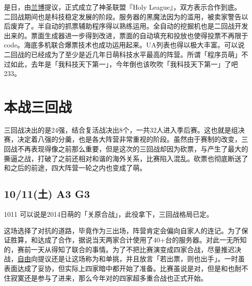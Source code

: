 是日，由\uline{兰博}提议，正式成立了神圣联盟『Holy League』，双方表示合作到底。
\\[1em]

二回战期间也是科技稳定发展的阶段。服务器的黑魔法因为的滥用，被卖家警告以后废弃了。半自动的抓票辅助程序得以熟练运用。全自动的挖掘机也是二回战开发出来的。票面生成器进一步得到改进，票面的自动填充和投放也使得投票不再限于code。海底多机联合爆票技术也成功运用起来。UA列表也得以极大丰富。可以说二回战的已经成为了至少是近几年日萌科技水平最高的阵营。所谓「程序员萌」不过如此，去年是「我科技天下第一」，今年倒也该吹吹「我科技天下第一」了吧233。

\chapter{本战三回战}

三回战决出的是24强，结合复活战决出8个，一共32人进入季后赛。这也就是组决赛，决定着八强的分羹，也是各大阵营非常重视的阶段。虽然由于赛制的改变，三回战不再表现得像之前那么重要，但是这次的三回战却因为砍票，与产生了最大的撕逼之战，打破了之前还相对和谐的海外关系，比赛陷入混乱。砍票也彻底断送了和之后的前途，四大阵营一轮之内也变成了萌。

\section{10/11(土) A3 G3}

1011 可以说是2014日萌的「关原合战」，此役拿下，三回战格局已定。



这场选择了对抗的道路，毕竟作为三出场，阵营肯定会偏向自家人的连记。为了保证胜算，和达成了合作，据说当天两家合计使用了40+台的服务器。对此一无所知的，赛前一天从得知了联合的事情。为了不把比赛演变成四家合战，尽量推迟决战，\uline{自由}向提议还是让这场称为和单挑，并且放言「若出票，则也出手」。一时虽表面达成了妥协，但实际上四家暗中都开始了准备。比赛虽说是对，但是和也耐不住寂寞还是参与了进来，那么今年对的四家超多重合战也正式开始。

